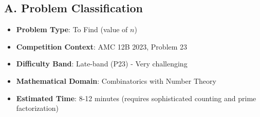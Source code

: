 \documentclass[12pt]{article}
\begin{document}
\begin{problemconfigbox}
\subsection*{A. Problem Classification}
\begin{itemize}[leftmargin=*]
    \item \textbf{Problem Type}: To Find (value of $n$)
    \item \textbf{Competition Context}: AMC 12B 2023, Problem 23
    \item \textbf{Difficulty Band}: Late-band (P23) - Very challenging
    \item \textbf{Mathematical Domain}: Combinatorics with Number Theory
    \item \textbf{Estimated Time}: 8-12 minutes (requires sophisticated counting and prime factorization)
\end{itemize}


\end{problemconfigbox}
\end{document}
